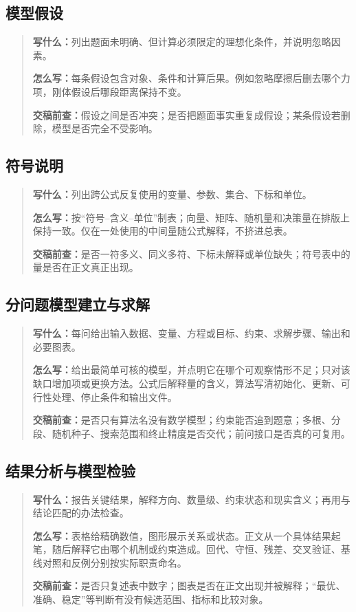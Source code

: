 \documentclass[UTF8,zihao=-4]{ctexart}
\begin{document}
\subsection{模型假设}
\begin{quote}\small
\noindent\textbf{\color{inkblue}写什么：}列出题面未明确、但计算必须限定的理想化条件，并说明忽略因素。\par
\noindent\textbf{\color{inkblue}怎么写：}每条假设包含对象、条件和计算后果。例如忽略摩擦后删去哪个力项，刚体假设后哪段距离保持不变。\par
\noindent\textbf{\color{inkblue}交稿前查：}假设之间是否冲突；是否把题面事实重复成假设；某条假设若删除，模型是否完全不受影响。
\end{quote}

\subsection{符号说明}
\begin{quote}\small
\noindent\textbf{\color{inkblue}写什么：}列出跨公式反复使用的变量、参数、集合、下标和单位。\par
\noindent\textbf{\color{inkblue}怎么写：}按“符号--含义--单位”制表；向量、矩阵、随机量和决策量在排版上保持一致。仅在一处使用的中间量随公式解释，不挤进总表。\par
\noindent\textbf{\color{inkblue}交稿前查：}是否一符多义、同义多符、下标未解释或单位缺失；符号表中的量是否在正文真正出现。
\end{quote}

\subsection{分问题模型建立与求解}
\begin{quote}\small
\noindent\textbf{\color{inkblue}写什么：}每问给出输入数据、变量、方程或目标、约束、求解步骤、输出和必要图表。\par
\noindent\textbf{\color{inkblue}怎么写：}给出最简单可核的模型，并点明它在哪个可观察情形不足；只对该缺口增加项或更换方法。公式后解释量的含义，算法写清初始化、更新、可行性处理、停止条件和输出文件。\par
\noindent\textbf{\color{inkblue}交稿前查：}是否只有算法名没有数学模型；约束能否追到题意；多根、分段、随机种子、搜索范围和终止精度是否交代；前问接口是否真的可复用。
\end{quote}

\subsection{结果分析与模型检验}
\begin{quote}\small
\noindent\textbf{\color{inkblue}写什么：}报告关键结果，解释方向、数量级、约束状态和现实含义；再用与结论匹配的办法检查。\par
\noindent\textbf{\color{inkblue}怎么写：}表格给精确数值，图形展示关系或状态。正文从一个具体结果起笔，随后解释它由哪个机制或约束造成。回代、守恒、残差、交叉验证、基线对照和反例分别按实际职责命名。\par
\noindent\textbf{\color{inkblue}交稿前查：}是否只复述表中数字；图表是否在正文出现并被解释；“最优、准确、稳定”等判断有没有候选范围、指标和比较对象。
\end{quote}
\end{document}
